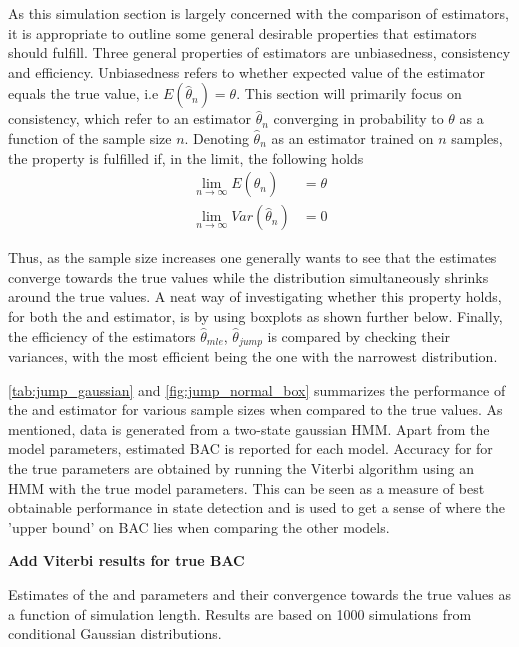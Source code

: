 As this simulation section is largely concerned with the comparison of estimators, it is appropriate to outline some general desirable properties that estimators should fulfill. Three general properties of estimators are unbiasedness, consistency and efficiency. Unbiasedness refers to whether expected value of the estimator equals the true value, i.e $E(\hat\theta_n)=\theta$. This section will primarily focus on consistency, which refer to an estimator $\hat\theta_n$ converging in probability to $\theta$ as a function of the sample size $n$. Denoting $\hat\theta_n$ as an estimator trained on $n$ samples, the property is fulfilled if, in the limit, the following holds
\begin{align}
    \lim_{n\to\infty} E(\hat\theta_n) &= \theta \\
    \lim_{n\to\infty} Var(\hat\theta_n) &= 0
\label{eq:sim_consistency}
\end{align}

Thus, as the sample size increases one generally wants to see that the estimates converge towards the true values while the distribution simultaneously shrinks around the true values. A neat way of investigating whether this property holds, for both the \mle and \jump estimator, is by using boxplots as shown further below. Finally, the efficiency of the estimators $\hat\theta_{mle}$, $\hat\theta_{jump}$ is compared by checking their variances, with the most efficient being the one with the narrowest distribution.

\cref{tab:jump_gaussian} and \cref{fig:jump_normal_box} summarizes the performance of the \mle and \jump estimator for various sample sizes when compared to the true values. As mentioned, data is generated from a two-state gaussian HMM. Apart from the model parameters, estimated BAC is reported for each model. Accuracy for for the true parameters are obtained by running the Viterbi algorithm using an HMM with the true model parameters. This can be seen as a measure of best obtainable performance in state detection and is used to get a sense of where the 'upper bound' on BAC lies when comparing the other models.

\textbf{Add Viterbi results for true BAC}
\begin{table}[H]
\centering
\caption[Estimates from conditional Gaussian distributions of the \mle and \jump parameters and their convergence towards the true values]{Estimates of the \mle and \jump parameters and their convergence towards the true values as a function of simulation length. Results are based on 1000 simulations from conditional Gaussian distributions.}

\label{tab:jump_gaussian}
\end{table}


